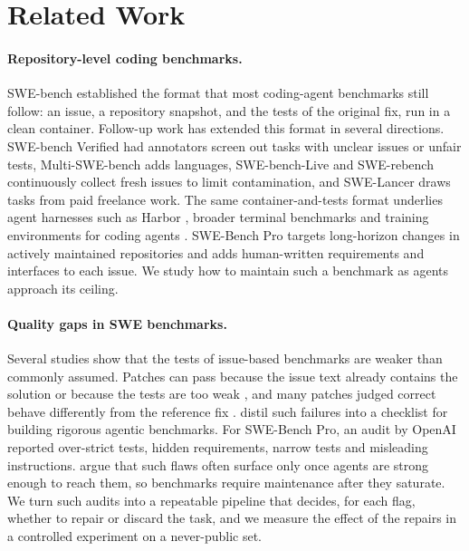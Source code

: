 \section{Related Work}

\paragraph{Repository-level coding benchmarks.} SWE-bench \citep{jimenez2024swebench} established the format that most coding-agent benchmarks still follow: an issue, a repository snapshot, and the tests of the original fix, run in a clean container. Follow-up work has extended this format in several directions. SWE-bench Verified \citep{openai2024verified} had annotators screen out tasks with unclear issues or unfair tests, Multi-SWE-bench \citep{zan2025multiswebb} adds languages, SWE-bench-Live \citep{swebenchlive2025} and SWE-rebench \citep{badertdinov2025rebench} continuously collect fresh issues to limit contamination, and SWE-Lancer \citep{miserendino2025swelancer} draws tasks from paid freelance work. The same container-and-tests format underlies agent harnesses such as Harbor \citep{harbor2026}, broader terminal benchmarks \citep{merrill2026terminalbench} and training environments for coding agents \citep{pan2024swegym,yang2025swesmith}. SWE-Bench Pro \citep{deng2025swebenchpro} targets long-horizon changes in actively maintained repositories and adds human-written requirements and interfaces to each issue. We study how to maintain such a benchmark as agents approach its ceiling.

\paragraph{Quality gaps in SWE benchmarks.} Several studies show that the tests of issue-based benchmarks are weaker than commonly assumed. Patches can pass because the issue text already contains the solution or because the tests are too weak \citep{aleithan2024swebenchplus}, and many patches judged correct behave differently from the reference fix \citep{wang2025solvedissues,utboost2025}. \citet{zhu2025abc} distil such failures into a checklist for building rigorous agentic benchmarks. For SWE-Bench Pro, an audit by OpenAI \citep{openai2026signal} reported over-strict tests, hidden requirements, narrow tests and misleading instructions. \citet{nadgir2026life} argue that such flaws often surface only once agents are strong enough to reach them, so benchmarks require maintenance after they saturate. We turn such audits into a repeatable pipeline that decides, for each flag, whether to repair or discard the task, and we measure the effect of the repairs in a controlled experiment on a never-public set.

